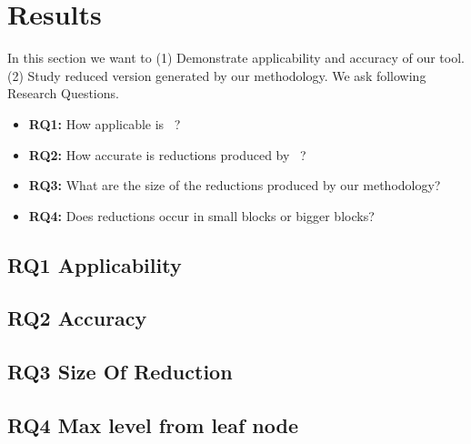 \section{Results}
In this section we want to (1) Demonstrate applicability and accuracy of our tool. (2) Study reduced version generated by our methodology. We ask following Research Questions.


\begin{itemize}
\renewcommand{\labelitemi}{$\bullet$}
\item \textbf{RQ1:} How applicable is \mytool\ ?
\item \textbf{RQ2:} How accurate is reductions produced by \mytool\ ?
\item \textbf{RQ3:} What are the size of the reductions produced by our methodology?
\item \textbf{RQ4:} Does reductions occur in small blocks or bigger blocks?
\end{itemize}


\subsection{RQ1 Applicability}
\label{sec:applicability}



\subsection{RQ2 Accuracy}
\label{sec:accuracy}


\subsection{RQ3 Size Of Reduction}
\label{sec:reductionsize}



\subsection{RQ4 Max level from leaf node}
\label{sec:leafnodelevel}
